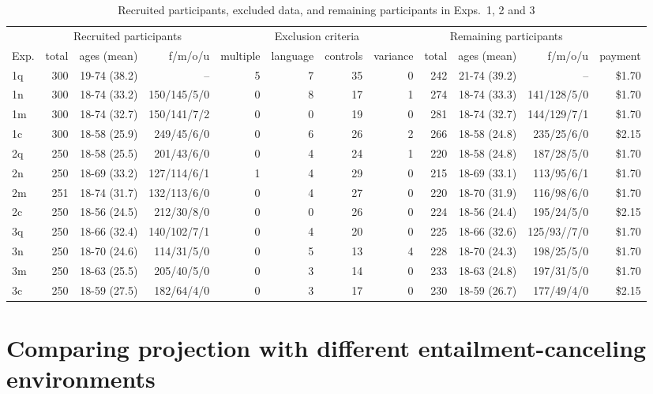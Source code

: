 \documentclass[11pt,fleqn]{article}
\newcommand{\6}{\mbox{$[\hspace*{-.6mm}[$}}
\newcommand{\9}{\mbox{$]\hspace*{-.6mm}]$}}
\begin{document}
\begin{table}
\centering
\begin{tabular}{l | r r r | r r r r | r r r | r }
&  \multicolumn{3}{c|}{Recruited participants} & \multicolumn{4}{c|}{Exclusion criteria} & \multicolumn{3}{c|}{Remaining participants} &  \\ 
Exp. & total & ages (mean) & f/m/o/u & multiple & language & controls & variance & total & ages (mean) & f/m/o/u & payment   \\ 
\hline
1q & 300  & 19-74 (38.2)  & --  & 5  & 7  & 35  & 0  & 242   & 21-74 (39.2) &  -- & \$1.70\\
1n & 300  & 18-74 (33.2)  &  150/145/5/0 & 0  & 8 & 17 & 1 & 274  & 18-74 (33.3) & 141/128/5/0 & \$1.70\\
1m & 300  & 18-74 (32.7) & 150/141/7/2  &  0 & 0  & 19 & 0   & 281   & 18-74 (32.7) & 144/129/7/1 & \$1.70 \\
1c &  300 & 18-58 (25.9)  & 249/45/6/0 & 0 & 6  & 26 & 2  & 266  &  18-58 (24.8) & 235/25/6/0  & \$2.15 \\
2q & 250  &  18-58 (25.5) &  201/43/6/0  & 0 & 4  & 24  & 1 & 220  & 18-58 (24.8)  & 187/28/5/0  & \$1.70 \\
2n & 250  &  18-69 (33.2)  &  127/114/6/1 & 1  & 4  & 29 & 0& 215  &  18-69 (33.1) & 113/95/6/1    & \$1.70\\
2m & 251  & 18-74 (31.7)  & 132/113/6/0  & 0  & 4  & 27 &  0 & 220  & 18-70 (31.9) & 116/98/6/0 & \$1.70\\
2c &  250 &  18-56 (24.5)  & 212/30/8/0  & 0  & 0  & 26 & 0  & 224  & 18-56 (24.4) & 195/24/5/0 & \$2.15\\
3q & 250  &  18-66 (32.4) &  140/102/7/1 &  0 & 4  & 20  & 0  &  225 & 18-66 (32.6) & 125/93//7/0  & \$1.70 \\
3n & 250  &  18-70 (24.6) & 114/31/5/0  & 0  & 5  &  13 & 4  & 228  & 18-70 (24.3) &  198/25/5/0 &\$1.70 \\
3m & 250  & 18-63 (25.5)  & 205/40/5/0 &  0 & 3  & 14 &  0 & 233  &  18-63 (24.8) & 197/31/5/0 &\$1.70 \\
3c & 250  & 18-59  (27.5) & 182/64/4/0  & 0  & 3  & 17 & 0 & 230  &  18-59 (26.7)  & 177/49/4/0  & \$2.15\\
\end{tabular}
\caption{Recruited participants, excluded data, and remaining participants in Exps.~1, 2 and 3}\label{t:exclusion}
\end{table} 

\section{Comparing projection with different entailment-canceling environments}\label{a-projection}
 
\end{document}
